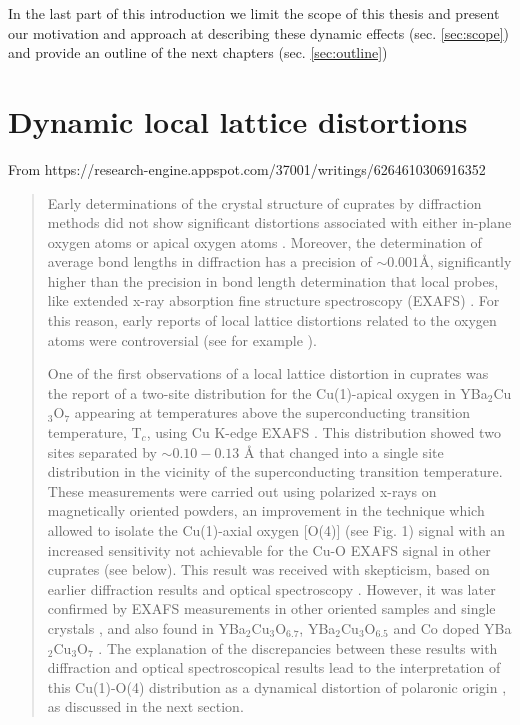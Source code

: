 In the last part of this introduction we limit the scope of this thesis and present our motivation and approach at describing these dynamic effects (sec. \ref{sec:scope}) and provide an outline of the next chapters (sec. \ref{sec:outline})

\section{Dynamic local lattice distortions}
\label{sec:dynamic_dist}

From https://research-engine.appspot.com/37001/writings/6264610306916352

\begin{quote}
Early determinations of the crystal structure of cuprates by diffraction methods did not show significant distortions associated with either in-plane oxygen atoms or apical oxygen atoms \cite{Capponi1987,Schafer1988}. 
Moreover, the determination of  average bond lengths in diffraction has a precision of $\sim 0.001$\AA \cite{Miceli1988}, significantly higher than the precision in bond length determination that local probes, like extended x-ray absorption fine structure spectroscopy (EXAFS) \cite{Rehr2000}. 
For this reason, early reports of local lattice distortions related to the oxygen atoms  were controversial (see for example \cite{battlog1992lattice,Kwei1990}).

One of the first observations of a local lattice distortion in cuprates was the report of a two-site distribution for the Cu(1)-apical oxygen in YBa$_{2}$Cu$_{3}$O$_{7}$  appearing at temperatures above the superconducting transition temperature, T$_{c}$, using Cu K-edge EXAFS \cite{MustredeLeon1990,Conradson1990}.
This distribution showed two sites separated by $\sim 0.10-0.13$ \AA \cite{Conradson1990,MustredeLeon1992a} that changed into a single site distribution in the vicinity of the superconducting transition temperature. 
These measurements were carried out using polarized x-rays on magnetically oriented powders, an improvement in the technique which allowed to isolate the Cu(1)-axial oxygen [O(4)] (see Fig. 1) signal with an increased sensitivity not achievable for the Cu-O EXAFS signal in other cuprates (see below). 
This result was received with skepticism, based on earlier diffraction results \cite{battlog1992lattice,Kwei1990,Sharma1991} and optical spectroscopy \cite{Thomsen1993}. 
However, it was later confirmed by EXAFS measurements in other oriented samples \cite{Stern1993} and single crystals \cite{Booth1996}, and also found in YBa$_{2}$Cu$_{3}$O$_{6.7}$, YBa$_{2}$Cu$_{3}$O$_{6.5}$ and Co doped YBa$_{2}$Cu$_{3}$O$_{7}$ \cite{MustredeLeon1991}. 
The explanation of the discrepancies between these results with diffraction and optical spectroscopical results lead to the interpretation of  this Cu(1)-O(4) distribution as a dynamical distortion of polaronic origin \cite{MustredeLeon1992}, as discussed in the next section.


\end{quote}
